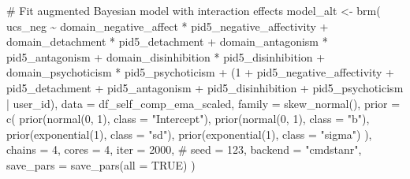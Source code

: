 \documentclass[
  11pt,
  a4paper,
  onecolumn]{article}
\newenvironment{Shaded}{}{}
\newcommand{\AttributeTok}[1]{\textcolor[rgb]{0.84,0.23,0.29}{#1}}
\newcommand{\CommentTok}[1]{\textcolor[rgb]{0.42,0.45,0.49}{#1}}
\newcommand{\ConstantTok}[1]{\textcolor[rgb]{0.00,0.36,0.77}{#1}}
\newcommand{\DecValTok}[1]{\textcolor[rgb]{0.00,0.36,0.77}{#1}}
\newcommand{\FunctionTok}[1]{\textcolor[rgb]{0.44,0.26,0.76}{#1}}
\newcommand{\NormalTok}[1]{\textcolor[rgb]{0.14,0.16,0.18}{#1}}
\newcommand{\OtherTok}[1]{\textcolor[rgb]{0.44,0.26,0.76}{#1}}
\newcommand{\SpecialCharTok}[1]{\textcolor[rgb]{0.00,0.36,0.77}{#1}}
\newcommand{\StringTok}[1]{\textcolor[rgb]{0.01,0.18,0.38}{#1}}
\begin{document}
\begin{Shaded}
\begin{Highlighting}[]
\CommentTok{\# Fit augmented Bayesian model with interaction effects}
\NormalTok{model\_alt }\OtherTok{\textless{}{-}} \FunctionTok{brm}\NormalTok{(}
\NormalTok{  ucs\_neg }\SpecialCharTok{\textasciitilde{}}
\NormalTok{    domain\_negative\_affect }\SpecialCharTok{*}\NormalTok{ pid5\_negative\_affectivity }\SpecialCharTok{+} 
\NormalTok{    domain\_detachment }\SpecialCharTok{*}\NormalTok{ pid5\_detachment }\SpecialCharTok{+}
\NormalTok{    domain\_antagonism }\SpecialCharTok{*}\NormalTok{ pid5\_antagonism }\SpecialCharTok{+} 
\NormalTok{    domain\_disinhibition }\SpecialCharTok{*}\NormalTok{ pid5\_disinhibition }\SpecialCharTok{+} 
\NormalTok{    domain\_psychoticism }\SpecialCharTok{*}\NormalTok{ pid5\_psychoticism }\SpecialCharTok{+}
\NormalTok{    (}\DecValTok{1} \SpecialCharTok{+}\NormalTok{ pid5\_negative\_affectivity }\SpecialCharTok{+}\NormalTok{ pid5\_detachment }\SpecialCharTok{+}\NormalTok{ pid5\_antagonism }\SpecialCharTok{+}
\NormalTok{       pid5\_disinhibition }\SpecialCharTok{+}\NormalTok{ pid5\_psychoticism }\SpecialCharTok{|}\NormalTok{ user\_id),}
  \AttributeTok{data =}\NormalTok{ df\_self\_comp\_ema\_scaled,}
  \AttributeTok{family =} \FunctionTok{skew\_normal}\NormalTok{(),}
  \AttributeTok{prior =} \FunctionTok{c}\NormalTok{(}
    \FunctionTok{prior}\NormalTok{(}\FunctionTok{normal}\NormalTok{(}\DecValTok{0}\NormalTok{, }\DecValTok{1}\NormalTok{), }\AttributeTok{class =} \StringTok{"Intercept"}\NormalTok{),}
    \FunctionTok{prior}\NormalTok{(}\FunctionTok{normal}\NormalTok{(}\DecValTok{0}\NormalTok{, }\DecValTok{1}\NormalTok{), }\AttributeTok{class =} \StringTok{"b"}\NormalTok{),}
    \FunctionTok{prior}\NormalTok{(}\FunctionTok{exponential}\NormalTok{(}\DecValTok{1}\NormalTok{), }\AttributeTok{class =} \StringTok{"sd"}\NormalTok{),}
    \FunctionTok{prior}\NormalTok{(}\FunctionTok{exponential}\NormalTok{(}\DecValTok{1}\NormalTok{), }\AttributeTok{class =} \StringTok{"sigma"}\NormalTok{)}
\NormalTok{  ),}
  \AttributeTok{chains =} \DecValTok{4}\NormalTok{,}
  \AttributeTok{cores =} \DecValTok{4}\NormalTok{,}
  \AttributeTok{iter =} \DecValTok{2000}\NormalTok{,}
  \CommentTok{\# seed = 123,}
  \AttributeTok{backend =} \StringTok{"cmdstanr"}\NormalTok{,}
  \AttributeTok{save\_pars =} \FunctionTok{save\_pars}\NormalTok{(}\AttributeTok{all =} \ConstantTok{TRUE}\NormalTok{)}
\NormalTok{)}
\end{Highlighting}
\end{Shaded}
\end{document}
